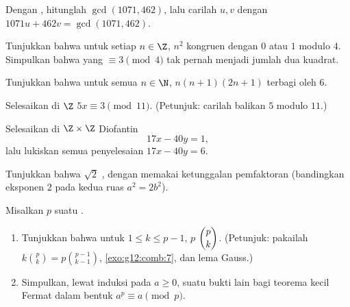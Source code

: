\begin{exercise}[$\star$]\label{exo:g12:arith:3}
Dengan , hitunglah $\gcd(1071, 462)$, lalu carilah 
$u, v$ dengan $1071u + 462v = \gcd(1071, 462)$.
\end{exercise}

\begin{exercise}[$\star$]\label{exo:g12:arith:4}
Tunjukkan bahwa untuk setiap $n \in \Z$, $n^2$ kongruen dengan $0$ atau $1$ modulo
$4$. Simpulkan bahwa  yang $\equiv 3 \pmod 4$ tak pernah menjadi
jumlah dua kuadrat.
\end{exercise}

\begin{exercise}[$\star\star$]\label{exo:g12:arith:5}
Tunjukkan bahwa untuk semua $n \in \N$, $n(n+1)(2n+1)$ terbagi oleh $6$.
\end{exercise}

\begin{exercise}[$\star\star$]\label{exo:g12:arith:6}
Selesaikan di $\Z$  $5x \equiv 3 \pmod{11}$.
(Petunjuk: carilah balikan $5$ modulo $11$.)
\end{exercise}

\begin{exercise}[$\star\star$]\label{exo:g12:arith:7}
Selesaikan di $\Z \times \Z$  Diofantin
\[
17x - 40y = 1,
\]
lalu lukiskan semua penyelesaian $17x - 40y = 6$.
\end{exercise}

\begin{exercise}[$\star\star$]\label{exo:g12:arith:8}
Tunjukkan bahwa $\sqrt2$ , dengan memakai ketunggalan pemfaktoran
 (bandingkan eksponen $2$ pada kedua ruas $a^2 = 2b^2$).
\end{exercise}

\begin{exercise}[$\star\star\star$]\label{exo:g12:arith:9}
Misalkan $p$ suatu .
\begin{enumerate}
  \item Tunjukkan bahwa untuk $1 \leq k \leq p - 1$, $p$  $\dbinom{p}{k}$.
        (Petunjuk: pakailah $k\binom pk = p\binom{p-1}{k-1}$, \cref{exo:g12:comb:7},
        dan lema Gauss.)
  \item Simpulkan, lewat induksi pada $a \geq 0$, suatu bukti lain bagi teorema
        kecil Fermat dalam bentuk $a^p \equiv a \pmod p$.
\end{enumerate}
\end{exercise}


